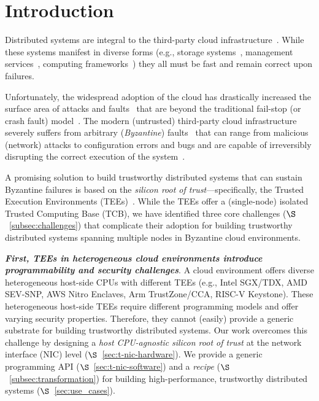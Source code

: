 \section{Introduction}
Distributed systems are integral to the third-party cloud infrastructure~\cite{amazon_ec2, microsoft_azure, rackspace, google_engine}. While these systems manifest in diverse forms (e.g., storage systems~\cite{dynamo, azure_storage, tao, spanner, 51, zippy, AmazonS3}, management services~\cite{Hunt:2010, Burns2016}, computing frameworks~\cite{aws_lambda, azure_functions, google_cloud_functions}) they all must be fast and remain correct upon failures. %

Unfortunately, the widespread adoption of the cloud has drastically increased the surface area of attacks and faults~\cite{Gunawi_bugs-in-the-cloud, Shinde2016, high_resolution_side_channels} that are beyond the traditional fail-stop (or crash fault) model~\cite{delporte}. The modern (untrusted) third-party cloud infrastructure severely suffers from arbitrary  ({\em Byzantine}) \linebreak faults~\cite{Lamport:1982} that can range from malicious (network) attacks to configuration errors and bugs and are capable of irreversibly disrupting the correct execution of the system~\cite{Gunawi_bugs-in-the-cloud, Shinde2016, high_resolution_side_channels, Castro:2002}.

A promising solution to build trustworthy distributed systems that can sustain Byzantine failures is based on the {\em silicon root of trust}---specifically, the Trusted Execution Environments (TEEs)~\cite{cryptoeprint:2016:086, arm-realm, amd-sev, riscv-multizone, intelTDX}. While the TEEs offer a (single-node) isolated Trusted Computing Base (TCB),  we have identified three core challenges ($\S$~\ref{subsec:challenges}) that complicate their adoption for building trustworthy distributed systems spanning multiple nodes in Byzantine cloud environments.

{\bf \em First, TEEs in heterogeneous cloud environments introduce programmability and security challenges}. A cloud environment offers diverse heterogeneous host-side CPUs with different TEEs (e.g., Intel SGX/TDX, AMD SEV-SNP, AWS Nitro Enclaves, Arm TrustZone/CCA, RISC-V Keystone). These heterogeneous host-side TEEs require different programming models and offer varying security properties. Therefore, they cannot (easily) provide a generic substrate for building trustworthy distributed systems. Our work overcomes this challenge by designing a {\em host CPU-agnostic} {\em silicon root of trust} at the network interface (NIC) level ($\S$~\ref{sec:t-nic-hardware}). We provide a generic programming API ($\S$~\ref{sec:t-nic-software}) and a {\em recipe} ($\S$~\ref{subsec:transformation}) for building high-performance, trustworthy distributed systems ($\S$~\ref{sec:use_cases}).

